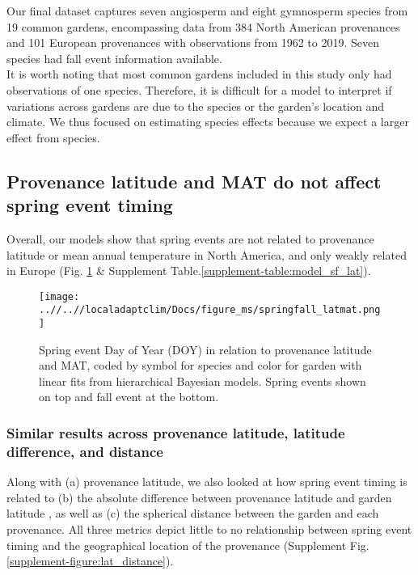 \documentclass{article}
\begin{document}
Our final dataset captures seven angiosperm and eight gymnosperm species from 19 common gardens, encompassing data from 384 North American provenances and 101 European provenances with observations from 1962 to 2019. Seven species had fall event information available. 
\\
It is worth noting that most common gardens included in this study only had observations of one species. Therefore, it is difficult for a model to interpret if variations across gardens are due to the species or the garden’s location and climate.  We thus focused on estimating species effects because we expect a larger effect from species. 


\subsection{Provenance latitude and MAT do not affect spring event timing}

Overall, our models show that spring events are not related to provenance latitude or mean annual temperature in North America, and only weakly related in Europe (Fig. \ref{figure:springfall_latmat} \& Supplement Table.\ref{supplement-table:model_sf_lat}). 


\begin{figure}[!h] 
    \centering
 \texttt{[image: ..//..//localadaptclim/Docs/figure\_ms/springfall\_latmat.png]}
    \caption{Spring event Day of Year (DOY) in relation to provenance latitude and MAT, coded by symbol for species and color for garden with linear fits from hierarchical Bayesian models. Spring events shown on top and fall event at the bottom.}
    \label{figure:springfall_latmat}
\end{figure}


\newpage

\subsubsection {Similar results across provenance latitude, latitude difference, and distance}
Along with (a) provenance latitude, we also looked at how spring event timing is related to (b) the absolute difference between provenance latitude and garden latitude , as well as (c) the spherical distance between the garden and each provenance. All three metrics depict little to no relationship between spring event timing and the geographical location of the provenance (Supplement Fig.\ref{supplement-figure:lat_distance}).
\end{document}
